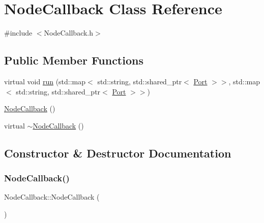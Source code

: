 \hypertarget{class_node_callback}{}\section{Node\+Callback Class Reference}
\label{class_node_callback}


{\ttfamily \#include $<$Node\+Callback.\+h$>$}

\subsection*{Public Member Functions}
\begin{DoxyCompactItemize}
\item 
virtual void \hyperlink{class_node_callback_a94eb8c2fd7162ffcc4abff8bd2e852b3}{run} (std\+::map$<$ std\+::string, std\+::shared\+\_\+ptr$<$ \hyperlink{class_port}{Port} $>$$>$, std\+::map$<$ std\+::string, std\+::shared\+\_\+ptr$<$ \hyperlink{class_port}{Port} $>$$>$)
\item 
\hyperlink{class_node_callback_a91f8bc71a7bc6164d831ab4fb8144810}{Node\+Callback} ()
\item 
virtual \hyperlink{class_node_callback_ac9474867612b9fa6327dfe5cc5d29bec}{$\sim$\+Node\+Callback} ()
\end{DoxyCompactItemize}


\subsection{Constructor \& Destructor Documentation}
\mbox{\label{class_node_callback_a91f8bc71a7bc6164d831ab4fb8144810}} 
\subsubsection{\texorpdfstring{Node\+Callback()}{NodeCallback()}}
{\footnotesize\ttfamily Node\+Callback\+::\+Node\+Callback (\begin{DoxyParamCaption}{ }\end{DoxyParamCaption})\hspace{0.3cm}{\ttfamily [inline]}}

\mbox{\label{class_node_callback_ac9474867612b9fa6327dfe5cc5d29bec}} 
